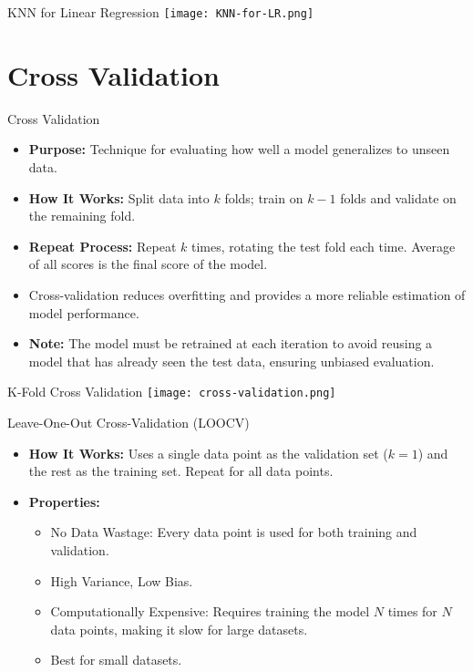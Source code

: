 \documentclass[serif, aspectratio=169]{beamer}
\begin{document}
\begin{frame}{KNN for Linear Regression}
    \hspace*{\fill}
    \texttt{[image: KNN-for-LR.png]}
    \hspace*{\fill}
\end{frame}

\section{Cross Validation}

\begin{frame}{Cross Validation}
\begin{itemize}
    \item \textbf{Purpose:} Technique for evaluating how well a model generalizes to unseen data.
    \item \textbf{How It Works:} Split data into $k$ folds; train on $k-1$ folds and validate on the remaining fold.
    \item \textbf{Repeat Process:} Repeat $k$ times, rotating the test fold each time. Average of all scores is the final score of the model.
    \item Cross-validation reduces overfitting and provides a more reliable estimation of model performance.
    \item \textbf{Note:} The model must be retrained at each iteration to avoid reusing a model that has already seen the test data, ensuring unbiased evaluation.
\end{itemize}
\end{frame}


\begin{frame}{K-Fold Cross Validation}
    \hspace*{\fill}
    \texttt{[image: cross-validation.png]}
    \hspace*{\fill}
\end{frame}

\begin{frame}{Leave-One-Out Cross-Validation (LOOCV)}
\begin{itemize}
    \item \textbf{How It Works:} Uses a single data point as the validation set ($k = 1$) and the rest as the training set. Repeat for all data points.
    \item \textbf{Properties:}
    \begin{itemize}
        \item No Data Wastage: Every data point is used for both training and validation.
        \item High Variance, Low Bias.
        \item Computationally Expensive: Requires training the model $N$ times for $N$ data points, making it slow for large datasets.
        \item Best for small datasets.
    \end{itemize}
\end{itemize}
\end{frame}
\end{document}

